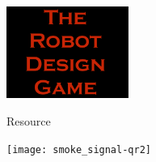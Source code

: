 \documentclass[11pt]{article}
\begin{document}
\color{white}            
    
    \begin{center}
        
        \rule{0pt}{10mm}    


        \includegraphics[trim=5 5 5 5,clip,height=3cm]{rdg_logo}%
        
        \rule{0pt}{5mm}    
        
        

Resource



        \rule{0pt}{5mm}    

        \texttt{[image: smoke\_signal-qr2]}%

        

    \end{center}
\end{document}
